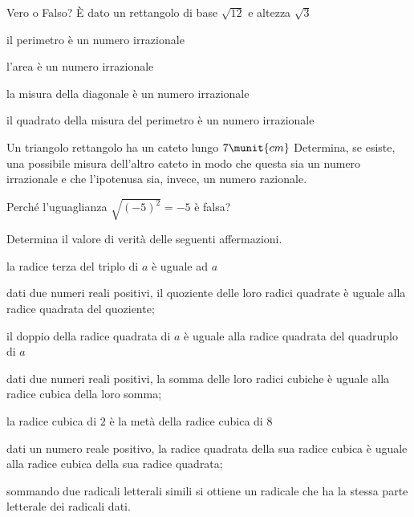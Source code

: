 \begin{esercizio}%
Vero o Falso? È dato un rettangolo di base \(\sqrt{12}\) e altezza 
\(\sqrt 3\)
\begin{enumeratea}
\item il perimetro è un numero irrazionale \hfill\verofalso
\item l'area è un numero irrazionale \hfill\verofalso
\item la misura della diagonale è un numero irrazionale \hfill\verofalso
\item il quadrato della misura del perimetro è un numero 
irrazionale \hfill\verofalso
\end{enumeratea}
\end{esercizio}

\begin{esercizio}%
Un triangolo rettangolo ha un cateto lungo \(7\munit{cm}\) Determina, se 
esiste, 
una possibile misura dell'altro cateto in modo che questa sia un numero 
irrazionale e che l'ipotenusa sia, invece, un numero razionale.
\end{esercizio}

\begin{esercizio}%
Perché l'uguaglianza \(\sqrt{(-5)^2}=-5\) è falsa?
\end{esercizio}

\begin{esercizio}%
Determina il valore di verità delle seguenti affermazioni.
\begin{enumeratea}
\item la radice terza del triplo di \(a\) è uguale ad \(a\)
\item dati due numeri reali positivi, il quoziente delle loro radici 
quadrate è uguale alla radice quadrata del quoziente;
\item il doppio della radice quadrata di \(a\) è uguale alla radice 
quadrata del quadruplo di \(a\)
\item dati due numeri reali positivi, la somma delle loro radici cubiche è 
uguale alla radice cubica della loro somma;
\item la radice cubica di \(2\) è la metà della radice cubica di \(8\)
\item dati un numero reale positivo, la radice quadrata della sua radice 
cubica è uguale alla radice cubica della sua radice quadrata;
\item sommando due radicali letterali simili si ottiene un radicale che ha 
la 
stessa parte letterale dei radicali dati.
\end{enumeratea}
\end{esercizio}

